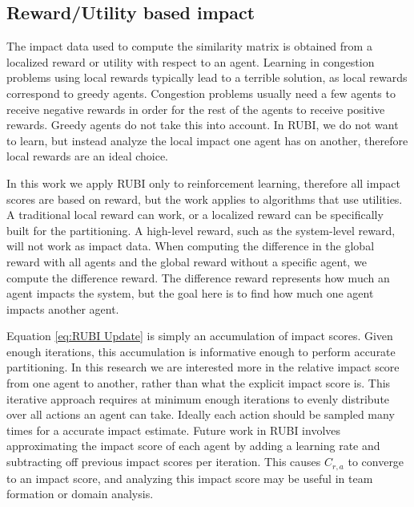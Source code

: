 \documentclass[letterpaper]{article}
\begin{document}
\subsection{Reward/Utility based impact}
The impact data used to compute the similarity matrix is obtained from a localized reward or utility with respect to an agent. Learning in congestion problems using local rewards typically lead to a terrible solution, as local rewards correspond to greedy agents. Congestion problems usually need a few agents to receive negative rewards in order for the rest of the agents to receive positive rewards. Greedy agents do not take this into account. In RUBI, we do not want to learn, but instead analyze the local impact one agent has on another, therefore local rewards are an ideal choice.

In this work we apply RUBI only to reinforcement learning, therefore all impact scores are based on reward, but the work applies to algorithms that use utilities. A traditional local reward can work, or a localized reward can be specifically built for the partitioning. A high-level reward, such as the system-level reward, will not work as impact data. When computing the difference in the global reward with all agents and the global reward without a specific agent, we compute the difference reward. The difference reward represents how much an agent impacts the system, but the goal here is to find how much one agent impacts another agent.

Equation \ref{eq:RUBI Update} is simply an accumulation of impact scores. Given enough iterations, this accumulation is informative enough to perform accurate partitioning. In this research we are interested more in the relative impact score from one agent to another, rather than what the explicit impact score is. This iterative approach requires at minimum enough iterations to evenly distribute over all actions an agent can take. Ideally each action should be sampled many times for a accurate impact estimate. Future work in RUBI involves approximating the impact score of each agent by adding a learning rate and subtracting off previous impact scores per iteration. This causes $C_{r,a}$ to converge to an impact score, and analyzing this impact score may be useful in team formation or domain analysis.


\end{document}
